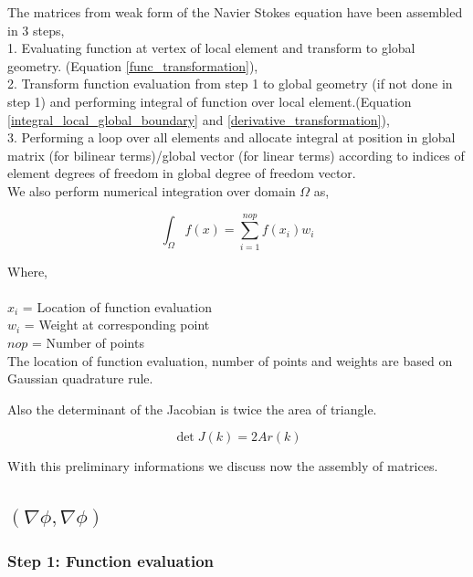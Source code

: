 \documentclass[a4paper,openany]{book}
\begin{document}
The matrices from weak form of the Navier Stokes equation have been assembled in 3 steps,
${}$\\
1. Evaluating function at vertex of local element and transform to global geometry. (Equation \eqref{func_transformation}),\\
2. Transform function evaluation from step 1 to global geometry (if not done in step 1) and performing integral of function over local element.(Equation \eqref{integral_local_global_boundary} and \eqref{derivative_transformation}),\\
3. Performing a loop over all elements and allocate integral at position in global matrix (for bilinear terms)/global vector (for linear terms) according to indices of element degrees of freedom in global degree of freedom vector.\\

We also perform numerical integration over domain $\Omega$ as,

\begin{equation}\label{numerical integration}
\int_{\Omega} f(x) = \sum_{i=1}^{nop} f(x_i) w_i
\end{equation}

Where, \\
${}$\\
$x_i$ = Location of function evaluation\\
$w_i$ = Weight at corresponding point\\
$nop$ = Number of points\\

The location of function evaluation, number of points and weights are based on Gaussian quadrature rule.

Also the determinant of the Jacobian is twice the area of triangle.

\begin{equation}\label{determinant to area}
\det J(k) = 2Ar(k)
\end{equation}

With this preliminary informations we discuss now the assembly of matrices.

\subsection{$(\nabla \phi, \nabla \phi)$}

\subsubsection{Step 1: Function evaluation}
\end{document}
